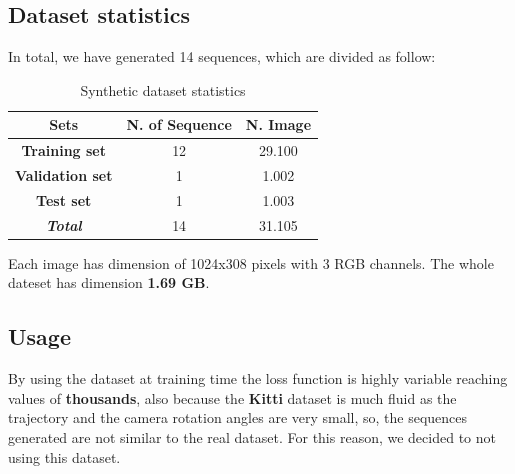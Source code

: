 \subsection{Dataset statistics}\label{subsec:dataset-statistics}
In total, we have generated 14 sequences, which are divided as follow:
\begin{table}[H]
    \center
    \begin{tabular}{|c|c|c|}
        \hline
        \textbf{Sets}           & \textbf{N. of Sequence} & \textbf{N. Image} \\ \hline
        \textbf{Training set}   & 12                      & 29.100            \\ \hline
        \textbf{Validation set} & 1                       & 1.002             \\ \hline
        \textbf{Test set}       & 1                       & 1.003             \\ \hline
        \textit{\textbf{Total}} & 14                      & 31.105            \\ \hline
    \end{tabular}\caption{Synthetic dataset statistics}
    \label{tab:synthetic-dataset-statistics}
\end{table}
Each image has dimension of 1024x308 pixels with 3 RGB channels.
The whole dateset has dimension \textbf{1.69 GB}.
\subsection{Usage}\label{subsec:usage}
By using the dataset at training time the loss function is highly variable reaching values of \textbf{thousands}, also because the \textbf{Kitti} dataset is much fluid as the trajectory and the camera rotation angles are very small, so, the sequences generated are not similar to the real dataset.
For this reason, we decided to not using this dataset.